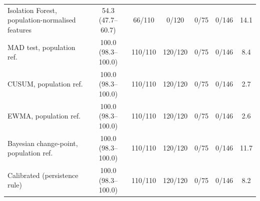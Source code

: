 \begin{table}[t]
{\begin{tabular}{lcccccc}
Isolation Forest, population-normalised features & 54.3 (47.7--60.7) & 66/110 & 0/120 & 0/75 & 0/146 & 14.1 \\
MAD test, population ref. & 100.0 (98.3--100.0) & 110/110 & 120/120 & 0/75 & 0/146 & 8.4 \\
CUSUM, population ref. & 100.0 (98.3--100.0) & 110/110 & 120/120 & 0/75 & 0/146 & 2.7 \\
EWMA, population ref. & 100.0 (98.3--100.0) & 110/110 & 120/120 & 0/75 & 0/146 & 2.6 \\
Bayesian change-point, population ref. & 100.0 (98.3--100.0) & 110/110 & 120/120 & 0/75 & 0/146 & 11.7 \\
Calibrated (persistence rule) & 100.0 (98.3--100.0) & 110/110 & 120/120 & 0/75 & 0/146 & 8.2 \\
\hline
\end{tabular}}
\end{table}

